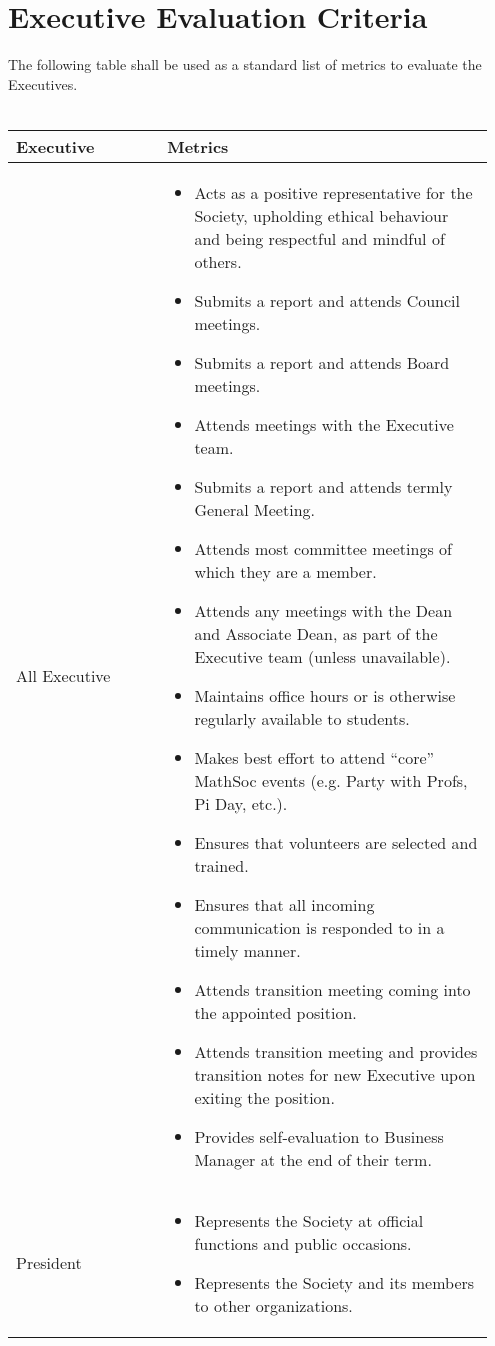 \section{Executive Evaluation Criteria}

The following table shall be used as a standard list of metrics to evaluate the Executives.\\
\\
\begin{longtable}{p{0.3\linewidth} p{0.65\linewidth}}
\toprule
Executive & Metrics\\
\midrule
All Executive &
\begin{itemize}
\item Acts as a positive representative for the Society, upholding ethical behaviour and being respectful and mindful of others.
\item Submits a report and attends Council meetings.
\item Submits a report and attends Board meetings.
\item Attends meetings with the Executive team.
\item Submits a report and attends termly General Meeting.
\item Attends most committee meetings of which they are a member.
\item Attends any meetings with the Dean and Associate Dean, as part of the Executive team (unless unavailable).
\item Maintains office hours or is otherwise regularly available to students.
\item Makes best effort to attend “core” MathSoc events (e.g. Party with Profs, Pi Day, etc.).
\item Ensures that volunteers are selected and trained.
\item Ensures that all incoming communication is responded to in a timely manner.
\item Attends transition meeting coming into the appointed position.
\item Attends transition meeting and provides transition notes for new Executive upon exiting the position.
\item Provides self-evaluation to Business Manager at the end of their term.
\end{itemize}
\\
\midrule
President &
\begin{itemize}
\item Represents the Society at official functions and public occasions.
\item Represents the Society and its members to other organizations.

\end{itemize}
\end{longtable}
